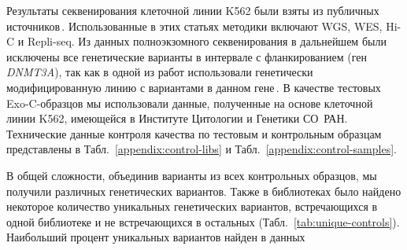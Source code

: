 \documentclass[a4paper,14pt]{extarticle}
\newcommand{\genename}[1]{\textit{#1}}
\newcommand{\ecitep}[1]{\textenglish{\citep{#1}}}
\newcommand{\tableref}[1]{Табл.~\ref{#1}}
\begin{document}
Результаты секвенирования клеточной линии K562 были взяты из публичных источников\,\ecitep{Banaszak_2018,Belaghzal_2017,Dixon_2018,Moquin_2017,Rao_2014,Ray_2019,Wang_2020,Zhou_2019}.
Использованные в этих статьях методики включают WGS, WES, Hi-C и Repli-seq.
Из данных полноэкзомного секвенирования в дальнейшем были исключены все генетические варианты в интервале  с фланкированием  (ген \genename{DNMT3A}), так как в одной из работ использовали генетически модифицированную линию с вариантами в данном гене\,\ecitep{Banaszak_2018}.
В качестве тестовых Exo-C-образцов мы использовали данные, полученные на основе клеточной линии K562, имеющейся в Институте Цитологии и Генетики СО~РАН.
Технические данные контроля качества по тестовым и контрольным образцам представлены в \tableref{appendix:control-libs} и \tableref{appendix:control-samples}.

В общей сложности, объединив варианты из всех контрольных образцов, мы получили  различных генетических вариантов.
Также в библиотеках было найдено некоторое количество уникальных генетических вариантов, встречающихся в одной библиотеке и не встречающихся в остальных (\tableref{tab:unique-controls}).
Наибольший процент уникальных вариантов найден в данных \citeauthor{Banaszak_2018}
\end{document}
